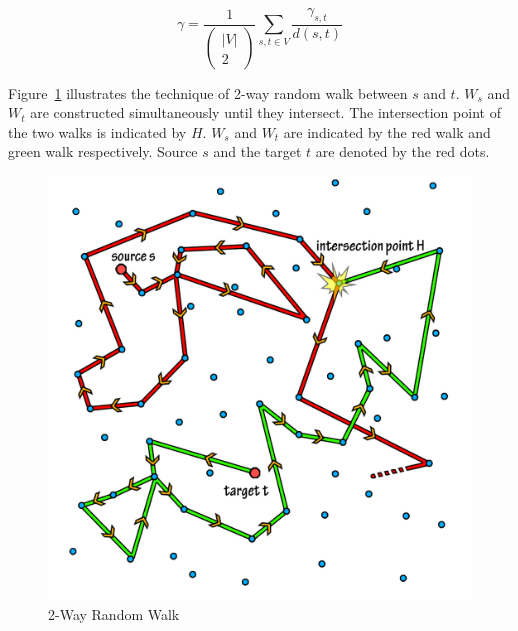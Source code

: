 \documentclass[a4paper,12pt]{article}
\begin{document}
$$\gamma = \frac{1}{\left(\begin{array}{c} |V|\\ 2\end{array}\right)} \sum_{s,t \in V} \frac{\gamma_{s,t}}{d(s,t)}$$

Figure~\ref{4_two_way} illustrates the technique of 2-way random walk between $s$ and $t$. 
$W_s$ and $W_t$ are constructed simultaneously until they intersect.
The intersection point of the two walks is indicated by $H$. $W_s$ and $W_t$ 
are indicated by the red walk and green walk respectively. Source $s$ and the 
target $t$ are denoted by the red dots. 

\begin{figure}[htp]
\centering
\includegraphics[scale=0.15]{Results/2rawrandomwalk.jpg}
\caption{2-Way Random Walk}
\label{4_two_way}
\end{figure}
\end{document}
